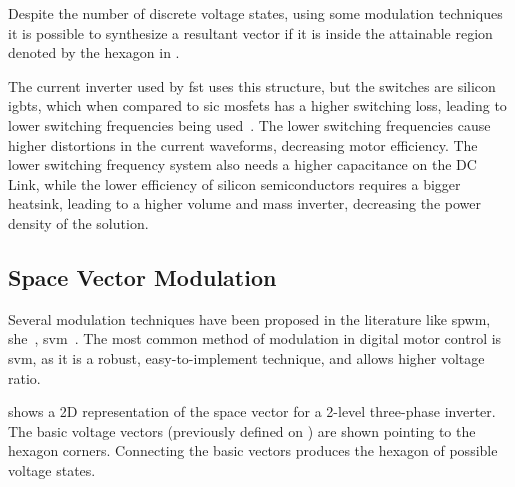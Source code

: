 Despite the number of discrete voltage states, using some modulation techniques it is possible to synthesize a resultant vector if it is inside the attainable region denoted by the hexagon in .

The current inverter used by \gls{fst} uses this structure, but the switches are silicon \glspl{igbt}, which when compared to \gls{sic} \glspl{mosfet} has a higher switching loss, leading to lower switching frequencies being used~\cite{Gurpinar:si_sic_gan_comparison:2016:IEEE}. The lower switching frequencies cause higher distortions in the current waveforms, decreasing motor efficiency. The lower switching frequency system also needs a higher capacitance on the DC Link, while the lower efficiency of silicon semiconductors requires a bigger heatsink, leading to a higher volume and mass inverter, decreasing the power density of the solution.

\subsection{Space Vector Modulation}
\label{subsection:Space Vector Modulation}%

Several modulation techniques have been proposed in the literature like \gls{spwm}, \gls{she}~\cite{Asadzadeh:selective_harmonic_elimination:2019}, \gls{svm}~\cite{Neacsu:SVM_intro:2001:IECON}.
The most common method of modulation in digital motor control is \gls{svm}, as it is a robust, easy-to-implement technique, and allows higher voltage ratio. 

 shows a 2D representation of the space vector for a 2-level three-phase inverter. The basic voltage vectors (previously defined on ) are shown pointing to the hexagon corners. 
 Connecting the basic vectors produces the hexagon of possible voltage states.

